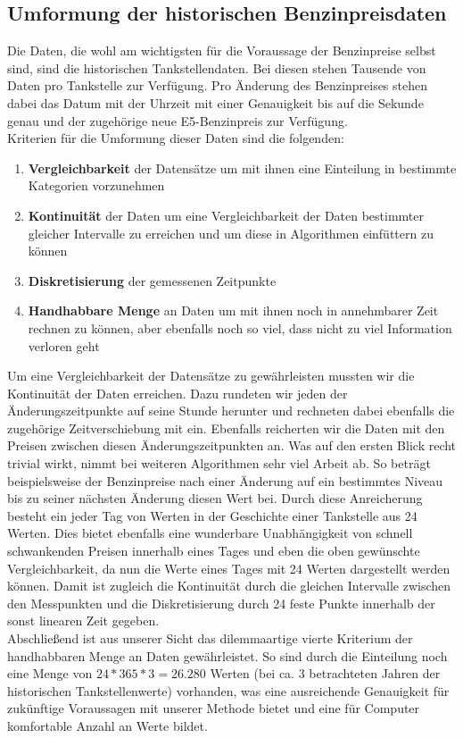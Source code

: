 \documentclass[11pt]{article}
\begin{document}
\subsection{Umformung der historischen Benzinpreisdaten}
	Die Daten, die wohl am wichtigsten für die Voraussage der Benzinpreise selbst sind, sind die historischen Tankstellendaten. Bei diesen stehen Tausende von Daten pro Tankstelle zur Verfügung. Pro Änderung des Benzinpreises stehen dabei das Datum mit der Uhrzeit mit einer Genauigkeit bis auf die Sekunde genau und der zugehörige neue E5-Benzinpreis zur Verfügung. 
	\\
	Kriterien für die Umformung dieser Daten sind die folgenden:
	\begin{enumerate}
		\item \textbf{Vergleichbarkeit} der Datensätze um mit ihnen eine Einteilung in bestimmte Kategorien vorzunehmen
		\item \textbf{Kontinuität} der Daten um eine Vergleichbarkeit der Daten bestimmter gleicher Intervalle zu erreichen und um diese in Algorithmen einfüttern zu können
		\item \textbf{Diskretisierung} der gemessenen Zeitpunkte
		\item \textbf{Handhabbare Menge} an Daten um mit ihnen noch in annehmbarer Zeit rechnen zu können, aber ebenfalls noch so viel, dass nicht zu viel Information verloren geht
	\end{enumerate}

	Um eine Vergleichbarkeit der Datensätze zu gewährleisten mussten wir die Kontinuität der Daten erreichen. Dazu rundeten wir jeden der Änderungszeitpunkte auf seine Stunde herunter und rechneten dabei ebenfalls die zugehörige Zeitverschiebung mit ein. Ebenfalls reicherten wir die Daten mit den Preisen zwischen diesen Änderungszeitpunkten an. Was auf den ersten Blick recht trivial wirkt, nimmt bei weiteren Algorithmen sehr viel Arbeit ab. So beträgt beispielsweise der Benzinpreise nach einer Änderung auf ein bestimmtes Niveau bis zu seiner nächsten Änderung diesen Wert bei. Durch diese Anreicherung besteht ein jeder Tag von Werten in der Geschichte einer Tankstelle aus 24 Werten. Dies bietet ebenfalls eine wunderbare Unabhängigkeit von schnell schwankenden Preisen innerhalb eines Tages und eben die oben gewünschte Vergleichbarkeit, da nun die Werte eines Tages mit 24 Werten dargestellt werden können. Damit ist zugleich die Kontinuität durch die gleichen Intervalle zwischen den Messpunkten und die Diskretisierung durch 24 feste Punkte innerhalb der sonst linearen Zeit gegeben. \\ Abschließend ist aus unserer Sicht das dilemmaartige vierte Kriterium der handhabbaren Menge an Daten gewährleistet. So sind durch die Einteilung noch eine Menge von $ 24 * 365 * 3 = 26.280 $ Werten (bei ca. 3 betrachteten Jahren der historischen Tankstellenwerte) vorhanden, was eine ausreichende Genauigkeit für zukünftige Voraussagen mit unserer Methode bietet und eine für Computer komfortable Anzahl an Werte bildet.
		
\end{document}
